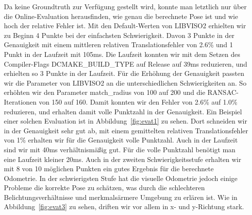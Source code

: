 \documentclass[12pt,titlepage, a4paper]{article}
\begin{document}
Da keine Groundtruth zur Verfügung gestellt wird, konnte man letztlich nur über die Online-Evaluation herausfinden, wie genau die berechnete Pose ist und wie hoch der relative Fehler ist.
Mit den Default-Werten von LIBVISO2 erhielten wir zu Beginn 4 Punkte bei der einfachsten Schwierigkeit. 
Davon 3 Punkte in der Genauigkeit mit einem mittleren relativen Translationsfehler von 2.6\% und 1 Punkt in der Laufzeit mit 105ms.
Die Laufzeit konnten wir mit dem Setzen des Compiler-Flags DCMAKE\_BUILD\_TYPE auf Release auf 39ms reduzieren, und erhielten so 3 Punkte in der Laufzeit.
Für die Erhöhung der Genauigkeit passten wir die Parameter von LIBVISO2 an die unterschiedlichen Schwierigkeiten an. 
So erhöhten wir den Parameter match\_radius von 100 auf 200 und die RANSAC-Iterationen von 150 auf 160.
Damit konnten wir den Fehler von 2.6\% auf 1.0\% reduzieren, und erhalten damit volle Punktzahl in der Genauigkeit.
Ein Beispiel einer solchen Evaluation ist in Abbildung~\ref{fig:evat1} zu sehen. Dort schneiden wir in der Genauigkeit sehr gut ab, mit einem gemittelten relativen Translationsfehler 
von 1\% erhalten wir für die Genauigkeit volle Punktzahl. Auch in der Laufzeit sind wir mit 40ms verhältnismäßig gut. Für die volle Punktzahl benötigt man eine Laufzeit kleiner 20ms.
Auch in der zweiten Schwierigkeitsstufe erhalten wir mit 8 von 10 möglichen Punkten ein gutes Ergebnis für die berechnete Odometrie. In der schwierigsten Stufe hat die visuelle Odometrie
jedoch einige Probleme die korrekte Pose zu schätzen, was durch die schlechteren Belichtungsverhältnisse und merkmalsärmere Umgebung zu erlären ist.
Wie in Abbildung~\ref{fig:evat3} zu sehen, driften wir vor allem in x- und y-Richtung stark.
\end{document}
